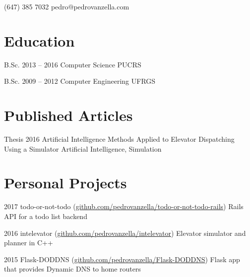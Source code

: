 \documentclass{tccv}
\begin{document}
    {(647) 385 7032}
    {pedro@pedrovanzella.com}

\section{Education}

\begin{yearlist}

\item[B.Sc.]{2013 -- 2016}
     {Computer Science}
     {PUCRS}

\item[B.Sc.]{2009 -- 2012}
     {Computer Engineering}
     {UFRGS}

\end{yearlist}

\section{Published Articles}
\begin{yearlist}
  \item[Thesis]{2016}
    {Artificial Intelligence Methods Applied to Elevator Dispatching Using a Simulator}
    {Artificial Intelligence, Simulation}
\end{yearlist}

\section{Personal Projects}

\begin{yearlist}

\item{2017}
  {todo-or-not-todo \newline (\href{https://github.com/pedrovanzella/todo-or-not-todo-rails}{github.com/pedrovanzella/todo-or-not-todo-rails})}
  {Rails API for a todo list backend}

\item{2016}
  {intelevator \newline (\href{https://github.com/vantas/intelevator}{github.com/pedrovanzella/intelevator})}
  {Elevator simulator and planner in C++}
  
\item{2015}
     {Flask-DODDNS \newline (\href{https://github.com/pedrovanzella/Flask-DODDNS}{github.com/pedrovanzella/Flask-DODDNS})}
     {Flask app that provides Dynamic DNS to home routers}

\end{yearlist}
\end{document}
